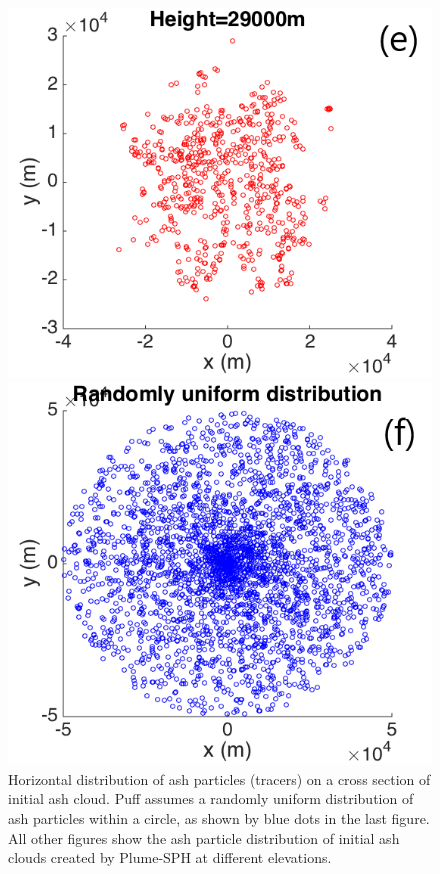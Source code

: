 \documentclass[draft,linenumbers]{agujournal2019}
\begin{document}
\begin{figure}[!htb]
\begin{minipage}{.325 \textwidth}
\centering
\includegraphics[width=0.99 \textwidth]{Figures/Possion-H29km-ParticleDis-h}
\end{minipage}%
\begin{minipage}{.325 \textwidth}
\centering
\includegraphics[width=0.99 \textwidth]{Figures/Possion-RDU-ParticleDis-h}
\end{minipage}%
\caption{Horizontal distribution of ash particles (tracers) on a cross section of initial ash cloud. Puff assumes a randomly uniform distribution of ash particles within a circle, as shown by blue dots in the last figure. All other figures show the ash particle distribution of initial ash clouds created by Plume-SPH at different elevations.}
\label{fig:initial-cloud-horizontal}
\end{figure}
\end{document}
